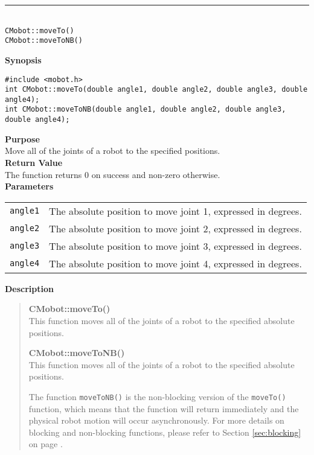 \noindent
\vspace{5pt}
\rule{4.5in}{0.015in}\\
\noindent
{\LARGE \texttt{CMobot::moveTo()}}\\
{\LARGE \texttt{CMobot::moveToNB()}}\\
{}

\noindent
{\bf Synopsis}
\vspace{-8pt}
\begin{verbatim}
#include <mobot.h>
int CMobot::moveTo(double angle1, double angle2, double angle3, double angle4);
int CMobot::moveToNB(double angle1, double angle2, double angle3, double angle4);
\end{verbatim}

\noindent
{\bf Purpose}\\
Move all of the joints of a robot to the specified positions.\\

\noindent
{\bf Return Value}\\
The function returns 0 on success and non-zero otherwise.\\

\noindent
{\bf Parameters}\\
\vspace{-0.1in}
\begin{description}
\item               
\begin{tabular}{p{15 mm}p{105 mm}}
\texttt{angle1} & The absolute position to move joint 1, expressed in degrees. \\
\texttt{angle2} & The absolute position to move joint 2, expressed in degrees. \\
\texttt{angle3} & The absolute position to move joint 3, expressed in degrees. \\
\texttt{angle4} & The absolute position to move joint 4, expressed in degrees. \\
\end{tabular}
\end{description}
\noindent

{\bf Description}\\
\vspace{-12pt}
\begin{quote}
{\bf CMobot::moveTo()}\\
This function moves all of the joints of a robot to the specified absolute positions. 

{\bf CMobot::moveToNB()}\\
This function moves all of the joints of a robot to the specified absolute positions. 

The function \texttt{moveToNB()} is the non-blocking version of
the \texttt{moveTo()} function, which means that the function will return
immediately and the physical robot motion will occur asynchronously. For
more details on blocking and non-blocking functions, please refer to 
Section \ref{sec:blocking} on page \pageref{sec:blocking}.\\
\end{quote}

